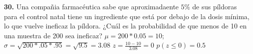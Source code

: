\documentclass[12pt, letterpaper]{article}
\begin{document}
    \textbf{30. }Una compañia farmacéutica sabe que aproximadaente $5\%$ de sus píldoras para el control natal tiene un
    ingrediente que está por debajo de la dosis mínima, lo que vuelve ineficaz la píldora. ¿Cuál es la probabilidad de que
    menos de 10 en una muestra de 200 sea ineficaz?\vskip0.5cm
    $\mu = 200*0.05=10$; $\sigma = \sqrt{200*.05*.95}=\sqrt{9.5}=3.08$\vskip0.5cm
    $z=\displaystyle\frac{10-10}{3.08}=0$\vskip0.5cm
    $p(z\leq 0)=0.5$
\end{document}
